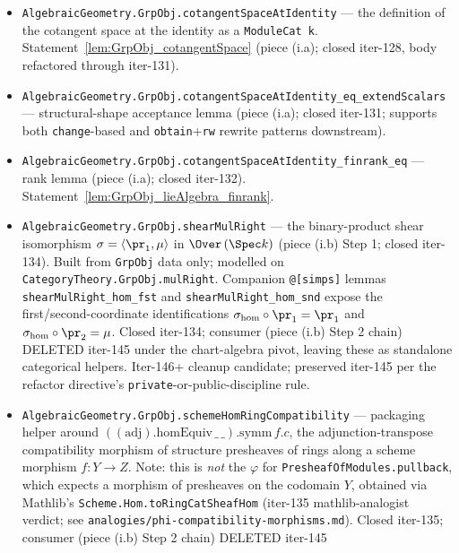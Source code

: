 \begin{itemize}
  \item \texttt{AlgebraicGeometry.GrpObj.cotangentSpaceAtIdentity}
        --- the definition of the cotangent space at the identity as a
        \texttt{ModuleCat k}. Statement~\cref{lem:GrpObj_cotangentSpace}
        (piece (i.a); closed iter-128, body refactored through iter-131).
  \item \texttt{AlgebraicGeometry.GrpObj.cotangentSpaceAtIdentity\_eq\_extendScalars}
        --- structural-shape acceptance lemma (piece (i.a); closed
        iter-131; supports both \texttt{change}-based and
        \texttt{obtain}+\texttt{rw} rewrite patterns downstream).
  \item \texttt{AlgebraicGeometry.GrpObj.cotangentSpaceAtIdentity\_finrank\_eq}
        --- rank lemma (piece (i.a); closed iter-132).
        Statement~\cref{lem:GrpObj_lieAlgebra_finrank}.
  \item \texttt{AlgebraicGeometry.GrpObj.shearMulRight} --- the binary-product
        shear isomorphism \(\sigma = \langle \pr_1, \mu \rangle\) in
        \(\Over\,(\Spec k)\) (piece (i.b) Step 1; closed iter-134). Built
        from \texttt{GrpObj} data only; modelled on
        \texttt{CategoryTheory.GrpObj.mulRight}. Companion \texttt{@[simps]}
        lemmas \texttt{shearMulRight\_hom\_fst} and
        \texttt{shearMulRight\_hom\_snd} expose the first/second-coordinate
        identifications \(\sigma_{\mathrm{hom}} \circ \pr_1 = \pr_1\) and
        \(\sigma_{\mathrm{hom}} \circ \pr_2 = \mu\). Closed iter-134;
        consumer (piece (i.b) Step 2 chain) DELETED iter-145 under the
        chart-algebra pivot, leaving these as standalone categorical
        helpers. Iter-146+ cleanup candidate; preserved iter-145 per the
        refactor directive's \texttt{private}-or-public-discipline rule.
  \item \texttt{AlgebraicGeometry.GrpObj.schemeHomRingCompatibility} ---
        packaging helper around \(((\mathrm{adj}).\mathrm{homEquiv}\,\_\,\_).\mathrm{symm}\,f.c\),
        the adjunction-transpose compatibility morphism of structure presheaves
        of rings along a scheme morphism \(f \colon Y \to Z\). Note: this is
        \emph{not} the \(\varphi\) for \texttt{PresheafOfModules.pullback},
        which expects a morphism of presheaves on the codomain \(Y\),
        obtained via Mathlib's \texttt{Scheme.Hom.toRingCatSheafHom}
        (iter-135 mathlib-analogist verdict; see
        \texttt{analogies/phi-compatibility-morphisms.md}). Closed
        iter-135; consumer (piece (i.b) Step 2 chain) DELETED iter-145

\end{itemize}
